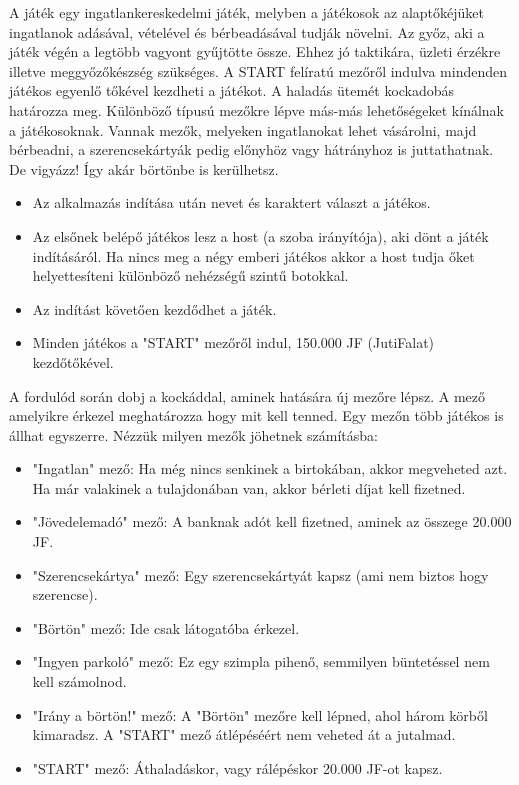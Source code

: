 

A játék egy ingatlankereskedelmi játék, melyben a játékosok az alaptőkéjüket ingatlanok adásával, vételével és bérbeadásával tudják növelni. Az győz, aki a játék végén a legtöbb vagyont gyűjtötte össze. Ehhez jó taktikára, üzleti érzékre illetve meggyőzőkészség szükséges. A START felíratú mezőről indulva mindenden játékos egyenlő tőkével kezdheti a játékot. A haladás ütemét kockadobás határozza meg. Különböző típusú mezőkre lépve más-más lehetőségeket kínálnak a játékosoknak. Vannak mezők, melyeken ingatlanokat lehet vásárolni, majd bérbeadni, a szerencsekártyák pedig előnyhöz vagy hátrányhoz is juttathatnak. De vigyázz! Így akár börtönbe is kerülhetsz. 


\begin{itemize}
\item Az alkalmazás indítása után nevet és karaktert választ a játékos.
\item Az elsőnek belépő játékos lesz a host (a szoba irányítója), aki dönt a játék indításáról. Ha nincs meg a négy emberi játékos akkor a host tudja őket helyettesíteni különböző nehézségű szintű botokkal.
\item Az indítást követően kezdődhet a játék.
\item Minden játékos a "START" mezőről indul, 150.000 JF (JutiFalat) kezdőtőkével.
\end{itemize}


A fordulód során dobj a kockáddal, aminek hatására új mezőre lépsz. A mező amelyikre érkezel meghatározza hogy mit kell tenned. Egy mezőn több játékos is állhat egyszerre. 
Nézzük milyen mezők jöhetnek számításba:

\begin{itemize}
\item "Ingatlan" mező: Ha még nincs senkinek a birtokában, akkor megveheted azt. Ha már valakinek a tulajdonában van, akkor bérleti díjat kell fizetned.
\item "Jövedelemadó" mező: A banknak adót kell fizetned, aminek az összege 20.000 JF.
\item "Szerencsekártya" mező: Egy szerencsekártyát kapsz (ami nem biztos hogy szerencse).
\item "Börtön" mező: Ide csak látogatóba érkezel.
\item "Ingyen parkoló" mező: Ez egy szimpla pihenő, semmilyen büntetéssel nem kell számolnod.
\item "Irány a börtön!" mező: A "Börtön" mezőre kell lépned, ahol három körből kimaradsz. A "START" mező átlépéséért nem veheted át a jutalmad.
\item "START" mező: Áthaladáskor, vagy rálépéskor 20.000 JF-ot kapsz.
\end{itemize}

